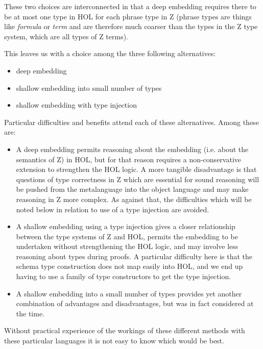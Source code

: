 \documentclass[10pt,titlepage]{book}
\begin{document}
These two choices are interconnected in that a deep embedding requires there to be at most one type in HOL for each phrase type in Z (phrase types are things like {\it formula} or {\it term} and are therefore much coarser than the types in the Z type system, which are all types of Z terms).

This leaves us with a choice among the three following alternatives:

\begin{itemize}
\item deep embedding
\item shallow embedding into small number of types
\item shallow embedding with type injection
\end{itemize}

Particular difficulties and benefits attend each of these alternatives.
Among these are:

\begin{itemize}
\item A deep embedding permits reasoning about the embedding (i.e. about the semantics of Z) in HOL, but for that reason requires a non-conservative extension to strengthen the HOL logic.
A more tangible disadvantage is that questions of type correctness in Z which are essential for sound reasoning will be pushed from the metalanguage into the object language and may make reasoning in Z more complex.
As against that, the difficulties which will be noted below in relation to use of a type injection are avoided.
\item A shallow embedding using a type injection gives a closer relationship between the type systems of Z and HOL, permits the embedding to be undertaken without strengthening the HOL logic, and may involve less reasoning about types during proofs.
A particular difficulty here is that the schema type construction does not map easily into HOL, and we end up having to use a family of type constructors to get the type injection.
\item A shallow embedding into a small number of types provides yet another combination of advantages and disadvantages, but was in fact considered at the time.
\end{itemize}

Without practical experience of the workings of these different methods with these particular languages it is not easy to know which would be best.
\end{document}
